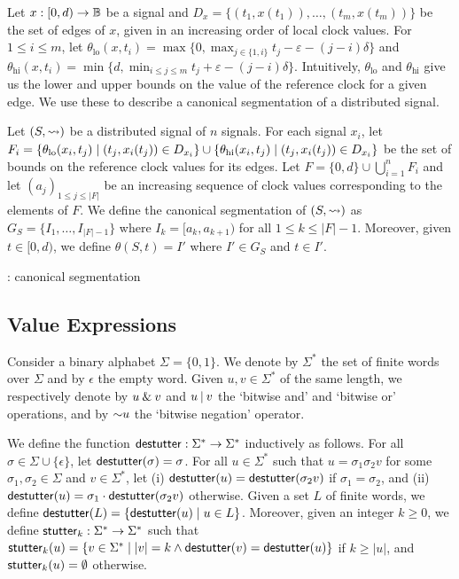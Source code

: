 Let $x : [0,d) \to \mathbb{B}$ be a signal and $D_x = \{(t_1, x(t_1)), \ldots, (t_m, x(t_m))\}$ be the set of edges of $x$, given in an increasing order of local clock values.
For $1 \leq i \leq m$, let $\theta_{\text{lo}}(x,t_i) = \max\{0, \max_{j \in \{1, i\}} t_j - \varepsilon - (j-i)\delta\}$ and $\theta_{\text{hi}}(x,t_i) = \min\{d, \min_{i \leq j \leq m} t_j + \varepsilon - (j-i)\delta\}$.
Intuitively, $\theta_{\text{lo}}$ and $\theta_{\text{hi}}$ give us the lower and upper bounds on the value of the reference clock for a given edge.
We use these to describe a canonical segmentation of a distributed signal.

Let $(S,{\rightsquigarrow})$ be a distributed signal of $n$ signals.
For each signal $x_i$, let $F_i = \{\theta_{\text{lo}}(x_i, t_j) \st (t_j, x_i(t_j)) \in D_{x_i}\} \cup \{\theta_{\text{hi}}(x_i, t_j) \st (t_j, x_i(t_j)) \in D_{x_i}\}$ be the set of bounds on the reference clock values for its edges.
Let $F = \{0, d\} \cup \bigcup_{i = 1}^{n} F_i$ and let $(a_j)_{1 \leq j \leq |F|}$ be an increasing sequence of clock values corresponding to the elements of $F$.
We define the canonical segmentation of $(S,{\rightsquigarrow})$ as $G_S = \{I_1, \ldots, I_{|F| - 1}\}$ where $I_k = [a_k, a_{k+1})$ for all $1 \leq k \leq |F| - 1$.
Moreover, given $t \in [0,d)$, we define $\theta(S,t) = I'$ where $I' \in G_S$ and $t \in I'$.

\begin{example}
	\TODO: canonical segmentation
\end{example}

\subsection{Value Expressions}

Consider a binary alphabet $\Sigma = \{0,1\}$.
We denote by $\Sigma^*$ the set of finite words over $\Sigma$ and by $\epsilon$ the empty word.
Given $u,v \in \Sigma^*$ of the same length, we respectively denote by $u \mathbin{\&} v$ and $u \mathbin{|} v$ the `bitwise and' and `bitwise or' operations, and by $\mathord{\sim} u$ the `bitwise negation' operator.

We define the function $\mathsf{destutter} : \Sigma^* \to \Sigma^*$ inductively as follows.
For all $\sigma \in \Sigma \cup \{\epsilon\}$, let $\mathsf{destutter}(\sigma) = \sigma$.
For all $u \in \Sigma^*$ such that $u = \sigma_1 \sigma_2 v$ for some $\sigma_1,\sigma_2 \in \Sigma$ and $v \in \Sigma^*$, let (i) $\mathsf{destutter}(u) = \mathsf{destutter}(\sigma_2 v)$ if $\sigma_1 = \sigma_2$, and (ii) $\mathsf{destutter}(u) = \sigma_1 \cdot \mathsf{destutter}(\sigma_2 v)$ otherwise.
Given a set $L$ of finite words, we define $\destutter(L) = \{\destutter(u) \st u \in L\}$.
Moreover, given an integer $k \geq 0$, we define $\mathsf{stutter}_k : \Sigma^* \to \Sigma^*$ such that $\stutter_k(u) = \{v \in \Sigma^* \st |v| = k \land \destutter(v) = \destutter(u)\}$ if $k \geq |u|$, and $\mathsf{stutter}_k(u) = \emptyset$ otherwise. %

